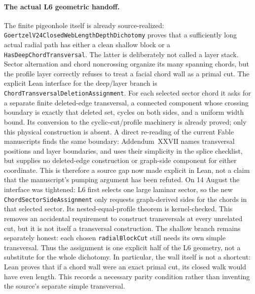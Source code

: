 \documentclass[11pt]{article}
\theoremstyle{definition}
\begin{document}
\paragraph{The actual L6 geometric handoff.}  The finite pigeonhole itself is
already source-realized: \texttt{GoertzelV24ClosedWebLengthDepthDichotomy}
proves that a sufficiently long actual radial path has either a clean shallow
block or a \texttt{HasDeepChordTransversal}.  The latter is deliberately not
called a layer stack.  Sector alternation and chord noncrossing organize its
many spanning chords, but the profile layer correctly refuses to treat a
facial chord wall as a primal cut.  The explicit Lean interface for the
deep/layer branch is \texttt{ChordTransversalDeletionAssignment}.  For each
selected sector chord it asks for a separate finite deleted-edge transversal,
a connected component whose crossing boundary is exactly that deleted set,
cycles on both sides, and a uniform width bound.  Its conversion to the
cyclic-cut/profile machinery is already proved; only this physical
construction is absent.  A direct re-reading of the current Fable manuscripts
finds the same boundary: Addendum~XXVII names transversal positions and layer
boundaries, and uses their simplicity in the splice checklist, but supplies no
deleted-edge construction or graph-side component for either coordinate.
This is therefore a source gap now made explicit in Lean, not a claim that
the manuscript's pumping argument has been refuted.  On 14 August the interface
was tightened: L6 first selects one large laminar sector, so the new
\texttt{ChordSectorSideAssignment} only requests graph-derived sides for the
chords in that selected sector.  Its nested-equal-profile theorem is
kernel-checked.  This removes an accidental requirement to construct
transversals at every unrelated cut, but it is not itself a transversal
construction.  The shallow branch remains separately honest: each
chosen \texttt{radialBlockCut} still needs its own simple transversal.  Thus
the assignment is one explicit half of the L6 geometry, not a substitute for
the whole dichotomy.  In particular, the wall itself is not a shortcut: Lean
proves that if a chord wall were an exact primal cut, its closed walk would
have even length.  This records a necessary parity condition rather than
inventing the source's separate simple transversal.
\end{document}
